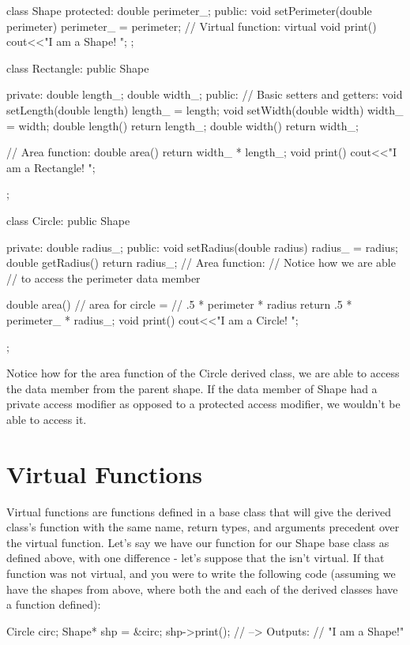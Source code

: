 \documentclass{tufte-handout}
\begin{document}
\begin{Code}
class Shape{
    protected:
        double perimeter_;
    public:
        void setPerimeter(double perimeter){
            perimeter_ = perimeter;
        }
        // Virtual function:
        virtual void print(){
            cout<<"I am a Shape! \n";
        }
};

class Rectangle: public Shape {
    private:
        double length_;
        double width_;
    public:
        // Basic setters and getters:
        void setLength(double length){
            length_ = length;
        }
        void setWidth(double width){
            width_ = width;
        }
        double length(){
            return length_;
        }
        double width(){
            return width_;
        }
        
        // Area function:
        double area(){
            return width_ * length_;
        }
        void print(){
            cout<<"I am a Rectangle! \n";
        }
        
};

class Circle: public Shape {
    private:
        double radius_;
    public:
        void setRadius(double radius){
            radius_ = radius;
        }
        double getRadius(){
            return radius_;
        }
        // Area function:
        // Notice how we are able
        // to access the perimeter data member
        
        double area(){
            // area for circle = 
            // .5 * perimeter * radius
            return .5 * perimeter_ * radius_;
        }
        void print(){
            cout<<"I am a Circle! \n";
        }
};
            
\end{Code}
Notice how for the area function of the Circle derived class, we are able to access the  data member from the parent shape.
If the  data member of Shape had a private access modifier as opposed to a protected access modifier, we wouldn't be able to access it.


\section{Virtual Functions}

Virtual functions are functions defined in a base class that will give the derived class's function with the same name, return types, and arguments precedent over the virtual function.
Let's say we have our  function for our Shape base class as defined above, with one difference - let's suppose that the  isn't virtual.
If that function was not virtual, and you were to write the following code (assuming we have the shapes from above, where both the  and each of the derived classes have a  function defined):
\begin{Code}
    Circle circ;
    Shape* shp = &circ;
    shp->print();
    // --> Outputs:
    // "I am a Shape!"
    
\end{Code}
\end{document}
